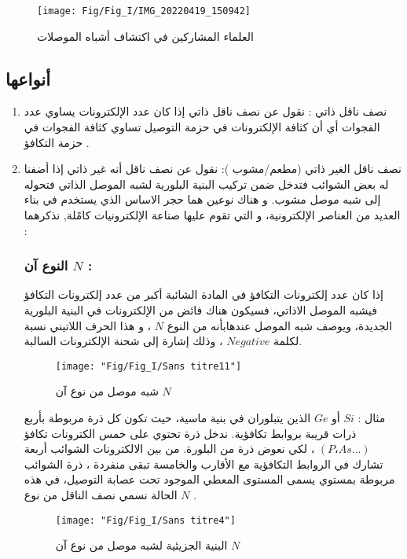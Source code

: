 \begin{figure}[bh]
	\centering
	\texttt{[image: Fig/Fig\_I/IMG\_20220419\_150942]}
	\caption{العلماء المشاركين في اكتشاف أشباه الموصلات}
	\label{fig:img20220419150942}
\end{figure}
\FloatBarrier

\subsection{ أنواعها}

\begin{enumerate}
	\item 
	نصف ناقل ذاتي : نقول عن نصف ناقل ذاتي إذا كان عدد الإلكترونات يساوي عدد الفجوات أي أن كثافة الإلكترونات في 
	حزمة التوصيل تساوي كثافة الفجوات في حزمة التكافؤ .
	\item 
	نصف ناقل الغير ذاتي (مطعم/مشوب ): نقول عن نصف ناقل أنه غير ذاتي إذا أضفنا له بعض الشوائب فتدخل ضمن تركيب البنية البلورية لشبه الموصل الذاتي فتحوله إلى شبه موصل مشوب. 
	و هناك نوعين هما حجر الاساس الذي يستخدم في بناء العديد من العناصر الإلكترونية، و التي تقوم عليها صناعة الإلكترونيات كامًلة, نذكرهما :
	
	\subsubsection*{ النوع آن $ N $ :}
	
		 إذا كان عدد إلكترونات التكافؤ في المادة الشائبة أكبر من عدد إلكترونات التكافؤ فيشبه الموصل الاذاتي، فسيكون هناك فائض من الإلكترونات في البنية البلورية الجديدة، ويوصف شبه الموصل عندهابأنه من النوع $ N $ ، و هذا الحرف اللاتيني نسبة لكلمة $ Negative $ ، وذلك إشارة إلى شحنة الإلكترونات السالبة.
		
		\begin{figure}[h]
			\centering
			\texttt{[image: "Fig/Fig\_I/Sans titre11"]}
			\caption{ شبه موصل من نوع آن $ N $ }
			\label{fig:sans-titre11}
		\end{figure}
	\FloatBarrier
		 
		مثال : $ Si $ أو $ Ge $ الذين يتبلوران في بنية ماسية، حيث تكون كل ذرة مربوطة بأربع ذرات قريبة بروابط تكافؤية. ندخل ذرة تحتوي على خمس الكترونات تكافؤ $ (P،As...) $ ، لكي نعوض ذرة من البلورة. من بين الالكترونات الشوائب أربعة تشارك في الروابط التكافؤية مع الأقارب والخامسة تبقى منفردة ، ذرة الشوائب مربوطة بمستوي يسمى المستوى المعطي الموجود تحت عصابة التوصيل، في هذه الحالة نسمي نصف الناقل من نوع $ N $ .
		
		\begin{figure}[h]
			\centering
			\texttt{[image: "Fig/Fig\_I/Sans titre4"]}
			\caption{البنية الجزيئية لشبه موصل من نوع آن $ N $}
			\label{fig:sans-titre4}
		\end{figure}
	\FloatBarrier
		

\end{enumerate}
